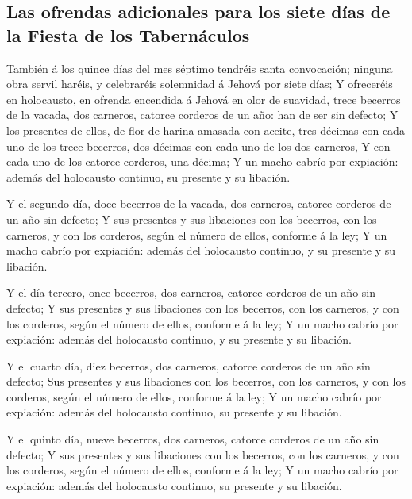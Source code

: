 \hypertarget{las-ofrendas-adicionales-para-los-siete-duxedas-de-la-fiesta-de-los-tabernuxe1culos}{%
\subsection{Las ofrendas adicionales para los siete días de la Fiesta de
los
Tabernáculos}\label{las-ofrendas-adicionales-para-los-siete-duxedas-de-la-fiesta-de-los-tabernuxe1culos}}

 También á los quince días del mes séptimo tendréis santa
convocación; ninguna obra servil haréis, y celebraréis solemnidad á
Jehová por siete días;  Y ofreceréis en holocausto, en
ofrenda encendida á Jehová en olor de suavidad, trece becerros de la
vacada, dos carneros, catorce corderos de un año: han de ser sin
defecto;  Y los presentes de ellos, de flor de harina
amasada con aceite, tres décimas con cada uno de los trece becerros, dos
décimas con cada uno de los dos carneros,  Y con cada uno
de los catorce corderos, una décima;  Y un macho cabrío por
expiación: además del holocausto continuo, su presente y su libación.

 Y el segundo día, doce becerros de la vacada, dos
carneros, catorce corderos de un año sin defecto;  Y sus
presentes y sus libaciones con los becerros, con los carneros, y con los
corderos, según el número de ellos, conforme á la ley;  Y
un macho cabrío por expiación: además del holocausto continuo, y su
presente y su libación.

 Y el día tercero, once becerros, dos carneros, catorce
corderos de un año sin defecto;  Y sus presentes y sus
libaciones con los becerros, con los carneros, y con los corderos, según
el número de ellos, conforme á la ley;  Y un macho cabrío
por expiación: además del holocausto continuo, y su presente y su
libación.

 Y el cuarto día, diez becerros, dos carneros, catorce
corderos de un año sin defecto;  Sus presentes y sus
libaciones con los becerros, con los carneros, y con los corderos, según
el número de ellos, conforme á la ley;  Y un macho cabrío
por expiación: además del holocausto continuo, su presente y su
libación.

 Y el quinto día, nueve becerros, dos carneros, catorce
corderos de un año sin defecto;  Y sus presentes y sus
libaciones con los becerros, con los carneros, y con los corderos, según
el número de ellos, conforme á la ley;  Y un macho cabrío
por expiación: además del holocausto continuo, su presente y su
libación.

